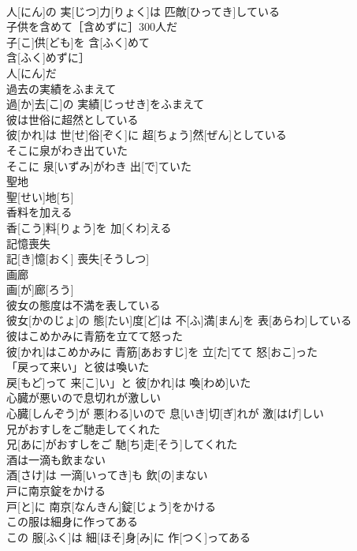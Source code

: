 \documentclass[8pt]{extreport}
\begin{document}
\begin{CJK}{UTF8}{min}
\\	人[にん]の 実[じつ]力[りょく]は 匹敵[ひってき]している
\\	子供を含めて［含めずに］300人だ	
\\	子[こ]供[ども]を 含[ふく]めて
\\	含[ふく]めずに］ 
\\	人[にん]だ
\\	過去の実績をふまえて	
\\	過[か]去[こ]の 実績[じっせき]をふまえて
\\	彼は世俗に超然としている	
\\	彼[かれ]は 世[せ]俗[ぞく]に 超[ちょう]然[ぜん]としている
\\	そこに泉がわき出ていた	
\\	そこに 泉[いずみ]がわき 出[で]ていた
\\	聖地	
\\	聖[せい]地[ち]
\\	香料を加える	
\\	香[こう]料[りょう]を 加[くわ]える
\\	記憶喪失	
\\	記[き]憶[おく] 喪失[そうしつ]
\\	画廊	
\\	画[が]廊[ろう]
\\	彼女の態度は不満を表している	
\\	彼女[かのじょ]の 態[たい]度[ど]は 不[ふ]満[まん]を 表[あらわ]している
\\	彼はこめかみに青筋を立てて怒った	
\\	彼[かれ]はこめかみに 青筋[あおすじ]を 立[た]てて 怒[おこ]った
\\	「戻って来い」と彼は喚いた	
\\	戻[もど]って 来[こ]い」と 彼[かれ]は 喚[わめ]いた
\\	心臓が悪いので息切れが激しい	
\\	心臓[しんぞう]が 悪[わる]いので 息[いき]切[ぎ]れが 激[はげ]しい
\\	兄がおすしをご馳走してくれた	
\\	兄[あに]がおすしをご 馳[ち]走[そう]してくれた
\\	酒は一滴も飲まない	
\\	酒[さけ]は 一滴[いってき]も 飲[の]まない
\\	戸に南京錠をかける	
\\	戸[と]に 南京[なんきん]錠[じょう]をかける
\\	この服は細身に作ってある	
\\	この 服[ふく]は 細[ほそ]身[み]に 作[つく]ってある

\end{CJK}
\end{document}
